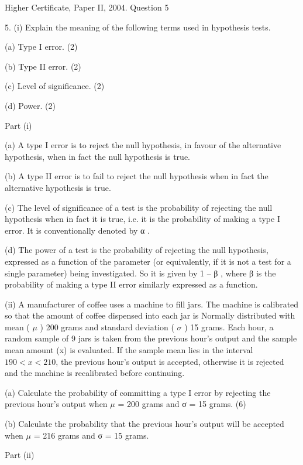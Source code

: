 \documentclass[a4paper,12pt]{article}
\begin{document}
Higher Certificate, Paper II, 2004.  Question 5 
 
\begin{framed}
5. (i) Explain the meaning of the following terms used in hypothesis tests. 
 
 (a) Type I error. 
(2) 
 
 (b) Type II error. 
(2) 
 
 (c) Level of significance. 
(2) 
 
 (d) Power. 
(2) 
\end{framed}

Part (i) 
 
(a) A type I error is to reject the null hypothesis, in favour of the alternative hypothesis, when in fact the null hypothesis is true. 
 
(b) A type II error is to fail to reject the null hypothesis when in fact the alternative hypothesis is true. 
 
(c) The level of significance of a test is the probability of rejecting the null hypothesis when in fact it is true, i.e. it is the probability of making a type I error.  It is conventionally denoted by α . 
 
(d) The power of a test is the probability of rejecting the null hypothesis, expressed as a function of the parameter (or equivalently, if it is not a test for a single parameter) being investigated.  So it is given by 1 – β , where β is the probability of making a type II error similarly expressed as a function. 
 
 
\newpage
\begin{framed}
 
 (ii) A manufacturer of coffee uses a machine to fill jars.  The machine is calibrated so that the amount of coffee dispensed into each jar is Normally distributed with mean ( $\mu$ ) 200 grams and standard deviation ( $\sigma$ ) 15 grams.  Each hour, a random sample of 9 jars is taken from the previous hour's output and the sample mean amount (x) is evaluated.  If the sample mean lies in the interval $190 < x < 210$, the previous hour's output is accepted, otherwise it is rejected and the machine is recalibrated before continuing. 
 
(a) Calculate the probability of committing a type I error by rejecting the previous hour's output when $\mu$  = 200 grams and σ  = 15 grams. (6) 
 
(b) Calculate the probability that the previous hour's output will be accepted when $\mu$  = 216 grams and σ  = 15 grams. 
     
\end{framed} 
Part (ii) 
 
\end{document}
